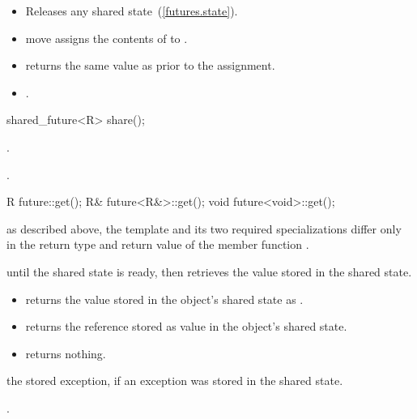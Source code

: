 \begin{itemdescr}
\pnum
\effects
\begin{itemize}
\item
Releases any shared state~(\ref{futures.state}).
\item
move assigns the contents of  to .
\end{itemize}

\pnum
\postconditions
\begin{itemize}
\item
{} returns the same value as  prior to the
assignment.

\item
{}.
\end{itemize}
\end{itemdescr}

%
%
\begin{itemdecl}
shared_future<R> share();
\end{itemdecl}

\begin{itemdescr}
\pnum
\returns {}.

\pnum
\postcondition {}.
\end{itemdescr}

%
%
\begin{itemdecl}
R future::get();
R& future<R&>::get();
void future<void>::get();
\end{itemdecl}

\begin{itemdescr}
\pnum
\realnote as described above, the template and its two required specializations differ only in
the return type and return value of the member function .

\pnum
\effects {} until the shared state is ready, then retrieves the
value stored in the shared state.

\pnum
\returns
\begin{itemize}
\item
{} returns the value  stored in the object's shared state as
.

\item
{} returns the reference stored as value in the object's shared state.

\item
{} returns nothing.
\end{itemize}

\pnum
\throws the stored exception, if an exception was stored in the shared state.

\pnum
\postcondition {}.
\end{itemdescr}

